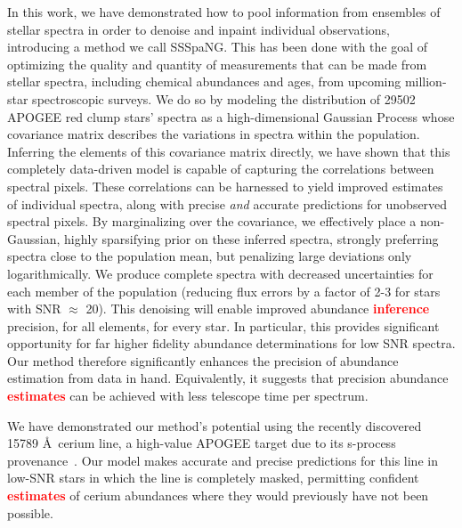 \documentclass[a4paper,fleqn,usenatbib]{mnras}
\newcommand\edit[1]{\textcolor{red}{\textbf{#1}}}
\begin{document}
In this work, we have demonstrated how to pool information from ensembles of stellar spectra in order to denoise and inpaint individual observations, introducing a method we call SSSpaNG. This has been done with the goal of optimizing the quality and quantity of measurements that can be made from stellar spectra, including chemical abundances and ages, from upcoming million-star spectroscopic surveys. We do so by modeling the distribution of 29502 APOGEE red clump stars' spectra as a high-dimensional Gaussian Process whose covariance matrix describes the variations in spectra within the population. Inferring the elements of this covariance matrix directly, we have shown that this completely data-driven model is capable of capturing the correlations between spectral pixels. These correlations can be harnessed to yield improved estimates of individual spectra, along with precise {\it and} accurate predictions for unobserved spectral pixels. By marginalizing over the covariance, we effectively place a non-Gaussian, highly sparsifying prior on these inferred spectra, strongly preferring spectra close to the population mean, but penalizing large deviations only logarithmically. We produce complete spectra with decreased uncertainties for each member of the population (reducing flux errors by a factor of 2-3 for stars with SNR $\approx$ 20). This denoising will enable improved abundance \edit{inference} precision, for all elements, for every star. In particular, this provides significant opportunity for far higher fidelity abundance determinations for low SNR spectra. Our method therefore significantly enhances the precision of abundance estimation from data in hand. Equivalently, it suggests that precision abundance \edit{estimates} can be achieved with less telescope time per spectrum.

We have demonstrated our method's potential using the recently discovered 15789 \AA\ cerium line, a high-value APOGEE target due to its s-process provenance~\citep{Cunha2017}. Our model makes accurate and precise predictions for this line in low-SNR stars in which the line is completely masked, permitting confident \edit{estimates} of cerium abundances where they would previously have not been possible.
\end{document}
